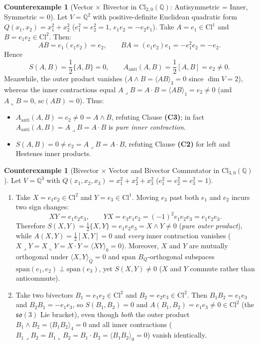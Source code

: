 \documentclass[11pt]{article}
\theoremstyle{plain}
\theoremstyle{definition}
\newtheorem{counterexample}[theorem]{Counterexample}
\theoremstyle{remark}
\newcommand{\Cl}{\mathrm{Cl}}
\newcommand{\grade}[2]{\langle #1 \rangle_{#2}}
\newcommand{\lcontract}{\mathbin{\lrcorner}}
\newcommand{\rcontract}{\mathbin{\llcorner}}
\begin{document}
\begin{counterexample}[Vector $\times$ Bivector in $\Cl_{2,0}(\mathbb{Q})$: Antisymmetric = Inner, Symmetric = $0$]\label{cex:cl2}
Let $V = \mathbb{Q}^2$ with positive-definite Euclidean quadratic form $Q(x_1, x_2) = x_1^2 + x_2^2$ ($e_1^2 = e_2^2 = 1$, $e_1 e_2 = -e_2 e_1$). Take $A = e_1 \in \Cl^1$ and $B = e_1 e_2 \in \Cl^2$. Then:
\[
  A B = e_1(e_1 e_2) = e_2, \qquad B A = (e_1 e_2) e_1 = -e_1^2 e_2 = -e_2.
\]
Hence
\[
  S(A, B) = \frac{1}{2}\{A, B\} = 0, \qquad A_{\mathrm{anti}}(A, B) = \frac{1}{2}[A, B] = e_2 \neq 0.
\]
Meanwhile, the outer product vanishes ($A \wedge B = \grade{A B}{3} = 0$ since $\dim V = 2$), whereas the inner contractions equal $A \lcontract B = A \cdot B = \grade{A B}{1} = e_2 \neq 0$ (and $A \rcontract B = 0$, $\mathrm{sc}(A B) = 0$). Thus:
\begin{itemize}
  \item $A_{\mathrm{anti}}(A, B) = e_2 \neq 0 = A \wedge B$, refuting Clause \textbf{(C3)}; in fact $A_{\mathrm{anti}}(A, B) = A \lcontract B = A \cdot B$ is \emph{pure inner contraction}.
  \item $S(A, B) = 0 \neq e_2 = A \lcontract B = A \cdot B$, refuting Clause \textbf{(C2)} for left and Hestenes inner products.
\end{itemize}
\end{counterexample}

\begin{counterexample}[Bivector $\times$ Vector and Bivector Commutator in $\Cl_{3,0}(\mathbb{Q})$]\label{cex:cl3}
Let $V = \mathbb{Q}^3$ with $Q(x_1, x_2, x_3) = x_1^2 + x_2^2 + x_3^2$ ($e_1^2 = e_2^2 = e_3^2 = 1$).
\begin{enumerate}
  \item[(a)] Take $X = e_1 e_2 \in \Cl^2$ and $Y = e_3 \in \Cl^1$. Moving $e_3$ past both $e_1$ and $e_2$ incurs two sign changes:
  \[
    X Y = e_1 e_2 e_3, \qquad Y X = e_3 e_1 e_2 = (-1)^2 e_1 e_2 e_3 = e_1 e_2 e_3.
  \]
  Therefore $S(X, Y) = \frac{1}{2}\{X, Y\} = e_1 e_2 e_3 = X \wedge Y \neq 0$ (\emph{pure outer product}), while $A(X, Y) = \frac{1}{2}[X, Y] = 0$ and \emph{every} inner contraction vanishes ($X \lcontract Y = X \rcontract Y = X \cdot Y = \grade{X Y}{0} = 0$). Moreover, $X$ and $Y$ are mutually orthogonal under $\langle X, Y \rangle_{\widetilde{Q}} = 0$ and span $B_Q$-orthogonal subspaces $\mathrm{span}(e_1, e_2) \perp \mathrm{span}(e_3)$, yet $S(X, Y) \neq 0$ ($X$ and $Y$ commute rather than anticommute).
  \item[(b)] Take two bivectors $B_1 = e_1 e_2 \in \Cl^2$ and $B_2 = e_2 e_3 \in \Cl^2$. Then $B_1 B_2 = e_1 e_3$ and $B_2 B_1 = -e_1 e_3$, so $S(B_1, B_2) = 0$ and $A(B_1, B_2) = e_1 e_3 \neq 0 \in \Cl^2$ (the $\mathfrak{so}(3)$ Lie bracket), even though \emph{both} the outer product $B_1 \wedge B_2 = \grade{B_1 B_2}{4} = 0$ and all inner contractions ($B_1 \lcontract B_2 = B_1 \rcontract B_2 = B_1 \cdot B_2 = \grade{B_1 B_2}{0} = 0$) vanish identically.
\end{enumerate}
\end{counterexample}
\end{document}
